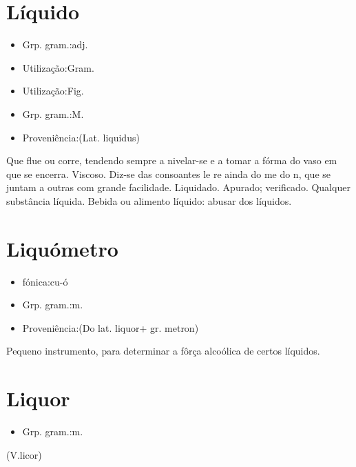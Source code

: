 \section{Líquido}
\begin{itemize}
\item {Grp. gram.:adj.}
\end{itemize}
\begin{itemize}
\item {Utilização:Gram.}
\end{itemize}
\begin{itemize}
\item {Utilização:Fig.}
\end{itemize}
\begin{itemize}
\item {Grp. gram.:M.}
\end{itemize}
\begin{itemize}
\item {Proveniência:(Lat. \textunderscore liquidus\textunderscore )}
\end{itemize}
Que flue ou corre, tendendo sempre a nivelar-se e a tomar a fórma do vaso em que se encerra.
Viscoso.
Diz-se das consoantes \textunderscore l\textunderscore  e \textunderscore r\textunderscore  e ainda do \textunderscore m\textunderscore  e do \textunderscore n\textunderscore , que se juntam a outras com grande facilidade.
Liquidado.
Apurado; verificado.
Qualquer substância líquida.
Bebida ou alimento líquido: \textunderscore abusar dos líquidos\textunderscore .
\section{Liquómetro}
\begin{itemize}
\item {fónica:cu-ó}
\end{itemize}
\begin{itemize}
\item {Grp. gram.:m.}
\end{itemize}
\begin{itemize}
\item {Proveniência:(Do lat. \textunderscore liquor\textunderscore  + gr. \textunderscore metron\textunderscore )}
\end{itemize}
Pequeno instrumento, para determinar a fôrça alcoólica de certos líquidos.
\section{Liquor}
\begin{itemize}
\item {Grp. gram.:m.}
\end{itemize}
(V.licor)
